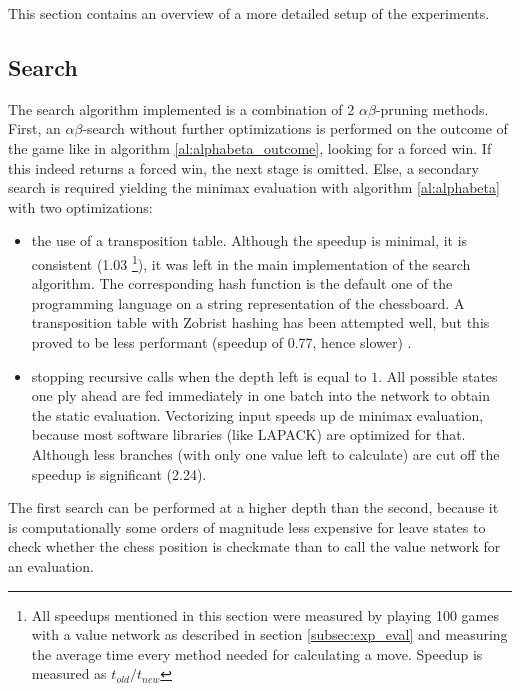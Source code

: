 This section contains an overview of a more detailed setup of the experiments.\\

\subsection{Search}
\label{subsec:search}
The search algorithm implemented is a combination of 2 $\alpha\beta$-pruning methods. First, an $\alpha\beta$-search without further optimizations is performed on the outcome of the game like in algorithm \ref{al:alphabeta_outcome}, looking for a forced win. If this indeed returns a forced win, the next stage is omitted. Else, a secondary search is required yielding the minimax evaluation with algorithm \ref{al:alphabeta} with two optimizations:
\begin{itemize}
\item the use of a transposition table. Although the speedup is minimal, it is consistent (1.03 \footnote{All speedups mentioned in this section were measured by playing 100 games with a value network as described in section \ref{subsec:exp_eval} and measuring the average time every method needed for calculating a move. Speedup is measured as $t_{old}/t_{new}$}), it was left in the main implementation of the search algorithm. The corresponding hash function is the default one of the programming language on a string representation of the chessboard. A transposition table with Zobrist hashing has been attempted well, but this proved to be less performant (speedup of 0.77, hence slower) \cite{patrascu12}.
\item stopping recursive calls when the depth left is equal to $1$. All possible states one ply ahead are fed immediately in one batch into the network to obtain the static evaluation. Vectorizing input speeds up de minimax evaluation, because most software libraries (like LAPACK) are optimized for that. Although less branches (with only one value left to calculate) are cut off the speedup is significant (2.24).
\end{itemize}
The first search can be performed at a higher depth than the second, because it is computationally some orders of magnitude less expensive for leave states to check whether the chess position is checkmate than to call the value network for an evaluation.

